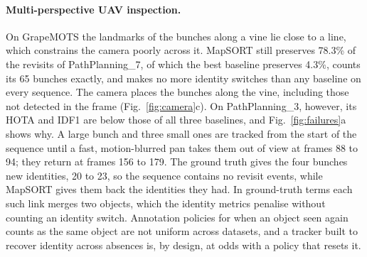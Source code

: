 \documentclass[pdflatex,sn-basic]{sn-jnl}%
\theoremstyle{thmstyleone}%
\begin{document}
\paragraph{Multi-perspective UAV inspection.} On GrapeMOTS the landmarks of the bunches along a vine lie close to a line, which constrains the camera poorly across it. MapSORT still preserves 78.3\% of the revisits of PathPlanning\_7, of which the best baseline preserves 4.3\%, counts its 65 bunches exactly, and makes no more identity switches than any baseline on every sequence. The camera places the bunches along the vine, including those not detected in the frame (Fig.~\ref{fig:camera}c). On PathPlanning\_3, however, its HOTA and IDF1 are below those of all three baselines, and Fig.~\ref{fig:failures}a shows why. A large bunch and three small ones are tracked from the start of the sequence until a fast, motion-blurred pan takes them out of view at frames 88 to 94; they return at frames 156 to 179. The ground truth gives the four bunches new identities, 20 to 23, so the sequence contains no revisit events, while MapSORT gives them back the identities they had. In ground-truth terms each such link merges two objects, which the identity metrics penalise without counting an identity switch. Annotation policies for when an object seen again counts as the same object are not uniform across datasets, and a tracker built to recover identity across absences is, by design, at odds with a policy that resets it.
\end{document}
